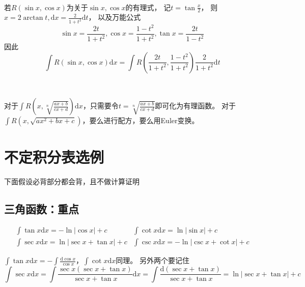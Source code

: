 ~

\begin{theorem}[三角有理式转化为有理式]
  若$R(\sin x, \cos x)$为关于$\sin x, \cos x$的有理式，
  记$t = \tan \frac{x}{2}$，
  则$x = 2 \arctan t, \mathrm{d} x = \frac{2}{1+t^2}\mathrm{d} t$，
  以及万能公式
  \begin{equation*}
    \sin x = \frac{2t}{1 + t^2}, \cos x = \frac{1 - t^2}{1+t^2}, \tan x = \frac{2t}{1 - t^2}
  \end{equation*}
  因此
  \begin{equation*}
    \int R(\sin x, \cos x )\mathrm{d} x = \int R \left( \frac{2t}{1+t^2}, \frac{1 - t^2}{1 + t^2} \right) \frac{2}{1+t^2} \mathrm{d} t
  \end{equation*}
\end{theorem}

~

\begin{theorem}[两类无理根式的不定积分]
  对于$\int R \left( x, \sqrt[n]{\frac{ax + b}{cx + d}} \right) \mathrm{d} x$，只需要令$t = \sqrt[n]{\frac{ax + b}{cx + d}}$即可化为有理函数。
  对于$\int R(x, \sqrt{ax^2 + bx + c})$，要么进行配方，要么用Euler变换。
\end{theorem}

\section{不定积分表选例}

下面假设必背部分都会背，且不做计算证明

\subsection{三角函数：重点}

\begin{exercise}[核心会算]
  \begin{equation*}
    \begin{array}{ll}
      \int \tan x \mathrm{d} x = - \ln |\cos x| + c&\int \cot x \mathrm{d} x =  \ln |\sin x| + c\\
      \int \sec x\mathrm{d} x = \ln |\sec x + \tan x| + c & \int \csc x \mathrm{d} x = - \ln |\csc x + \cot x| + c
    \end{array}
  \end{equation*}
\end{exercise}

\begin{solution}
  $\int \tan x \mathrm{d} x = - \int \frac{\mathrm{d} \cos x}{\cos x}$，$\int \cot x \mathrm{d} x$同理。
  另外两个要记住
  \begin{equation*}
    \int \sec x \mathrm{d} x = \int \frac{\sec x ( \sec x + \tan x)}{\sec x + \tan x}\mathrm{d} x  = \int \frac{\mathrm{d}(\sec x + \tan x)}{\sec x + \tan x}= \ln |\sec x + \tan x|+c
  \end{equation*}
\end{solution}

